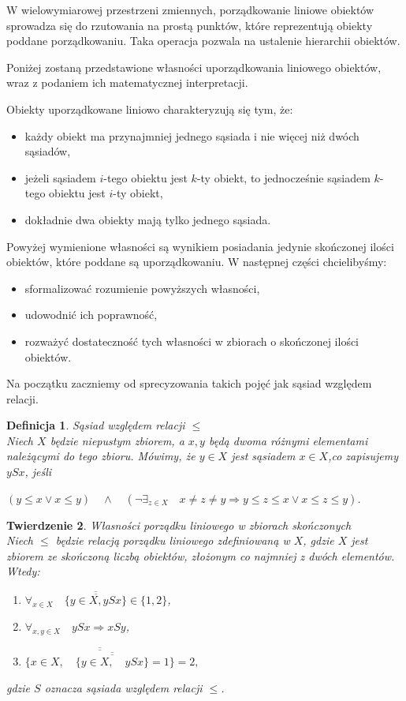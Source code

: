 \documentclass[12pt,a4paper]{report}
\newtheorem{theorem}{Twierdzenie}[section]
\newtheorem{definition}[theorem]{Definicja}
\newcommand{\licznosc}[1]{\overline{\overline{#1}}}
\begin{document}
W wielowymiarowej przestrzeni zmiennych, porządkowanie liniowe obiektów sprowadza się do rzutowania na prostą punktów, które reprezentują obiekty poddane porządkowaniu.  Taka operacja pozwala na ustalenie hierarchii obiektów.

Poniżej zostaną przedstawione własności uporządkowania liniowego obiektów, wraz z podaniem ich matematycznej interpretacji.

Obiekty uporządkowane liniowo charakteryzują się tym, że:
\begin{itemize}
\item każdy obiekt ma przynajmniej jednego sąsiada i nie więcej niż dwóch sąsiadów,
\item jeżeli sąsiadem $i$-tego obiektu jest $k$-ty obiekt, to jednocześnie sąsiadem $k$-tego obiektu jest $i$-ty obiekt,
\item dokładnie dwa obiekty mają tylko jednego sąsiada.
\end{itemize}


Powyżej wymienione własności są wynikiem posiadania jedynie skończonej ilości obiektów, które poddane są uporządkowaniu. W następnej części chcielibyśmy:
\begin{itemize}
\item sformalizować rozumienie powyższych własności,
\item udowodnić ich poprawność,
\item rozważyć dostateczność tych własności w zbiorach o skończonej ilości obiektów.
\end{itemize}


Na początku zaczniemy od sprecyzowania takich pojęć jak sąsiad względem relacji.

\begin{definition}{Sąsiad względem relacji $\leq$}\label{def-sasiada} \\
Niech  $X$ będzie niepustym zbiorem, a $x, y$ będą dwoma różnymi elementami należącymi do tego zbioru. Mówimy, że $y \in X$ jest sąsiadem $x \in X$,co zapisujemy $ySx$, jeśli

$\left(y \leq x \lor x \leq y \right) \quad \land \quad  \left(\lnot \exists_{z \in X}  \quad x\neq z \neq y \Rightarrow   y \leq z \leq x \lor x \leq z \leq y \right)$.
\end{definition}


\begin{theorem}{Własności porządku liniowego w zbiorach skończonych}\\
Niech $\leq$ będzie relacją porządku liniowego zdefiniowaną w $X$, gdzie $X$ jest zbiorem ze skończoną liczbą obiektów, złożonym co najmniej z dwóch elementów. Wtedy:
\begin{enumerate}
\item $\forall_{x \in X} \quad \licznosc{\{y \in X, ySx\}} \in \{1,2\}$,
\item $\forall_{x, y \in X} \quad ySx \Rightarrow xSy $,
\item $\licznosc{\{x \in X, \quad \licznosc{\{y \in X, \quad ySx \}}=1\}}=2,$
\end{enumerate}
gdzie $S$ oznacza sąsiada względem relacji $\leq$.
\end{theorem}
\end{document}
